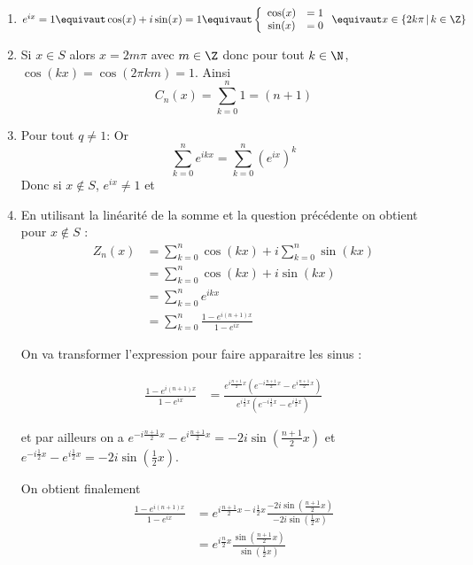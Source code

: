\documentclass[a4paper, 11pt,reqno]{article}
\begin{document}
\begin{correction}
\begin{enumerate}
\item $e^{ix}=1\equivaut \cos(x)+i\sin(x)=1 \equivaut 
\left\{ 
\begin{array}{cc}
\cos(x)&=1\\
\sin(x)&=0
\end{array}
\right.
\equivaut x\in \{ 2k \pi\, |\, k\in \Z\}$

\item Si $x\in S$ alors $x=2m\pi $ avec $m\in \Z$ donc 
pour tout $k\in \N$, $\cos(kx)= \cos(2\pi k  m) =1$. Ainsi 
$$C_n(x) = \sum_{k=0}^n 1= (n+1)$$

\item 
Pour tout $q\neq 1$:
Or
$$\sum_{k=0}^n e^{ikx} =\sum_{k=0}^n (e^{ix}) ^k$$
Donc si $x\notin S$, $e^{ix}\neq 1$ et 


\item 
En utilisant la linéarité de la somme et la question précédente on obtient pour $x\notin S$ : 
\begin{align*}
Z_n(x)&= \sum_{k=0}^n \cos(kx)+i\sum_{k=0}^n \sin(kx)\\
	 &=  \sum_{k=0}^n \cos(kx)+i \sin(kx)\\
	 &=  \sum_{k=0}^n e^{ikx}\\
	 &=  \sum_{k=0}^n  \frac{1-e^{i(n+1)x}}{1-e^{ix}}
\end{align*}

On va transformer l'expression pour faire apparaitre les sinus : 

\begin{align*}
 \frac{1-e^{i(n+1)x}}{1-e^{ix}}  &=  \frac{ e^{i\frac{n+1}{2}x} \left(    e^{-i\frac{n+1}{2}x}-e^{i\frac{n+1}{2}x}\right)}{e^{i\frac{1}{2}x}\left(e^{-i\frac{1}{2}x}-e^{i\frac{1}{2}x}\right) }  
\end{align*}

et par ailleurs on a $  e^{-i\frac{n+1}{2}x}-e^{i\frac{n+1}{2}x}=-2i \sin \left( \frac{n+1}{2}x\right) $ et $  e^{-i\frac{1}{2}x}-e^{i\frac{1}{2}x}=-2i \sin \left( \frac{1}{2}x\right) $.

On obtient finalement 
\begin{align*}
 \frac{1-e^{i(n+1)x}}{1-e^{ix}} &=e^{i\frac{n+1}{2}x- i \frac{1}{2}x}  \frac{-2i \sin \left( \frac{n+1}{2}x\right)}{-2i \sin \left( \frac{1}{2}x\right)}\\
 &= e^{i\frac{n}{2}x}  \frac{\sin \left( \frac{n+1}{2}x\right)}{\sin \left( \frac{1}{2}x\right)}\\
\end{align*}


\end{enumerate}
\end{correction}
\end{document}
